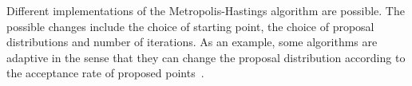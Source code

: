 Different implementations of the Metropolis-Hastings algorithm are 
possible. The possible changes include the choice of starting point,
the choice of proposal distributions and number of iterations. As an
example, some algorithms are adaptive in the sense that they can change 
the proposal distribution according to the acceptance rate of proposed 
points~\cite{Gelman2013}.
